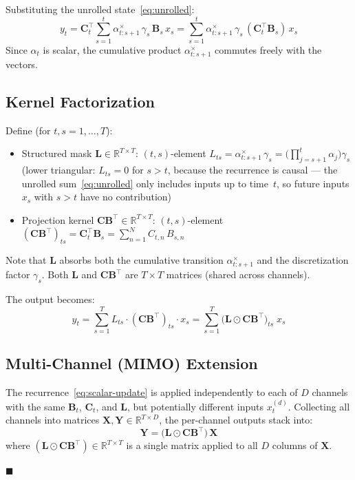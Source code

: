 \documentclass[11pt,a4paper]{article}
\begin{document}
Substituting the unrolled state~\eqref{eq:unrolled}:
\begin{equation}
  y_t = \mathbf{C}_t^\top \sum_{s=1}^{t}\alpha_{t:s+1}^\times\,\gamma_s\,\mathbf{B}_s\,x_s
  = \sum_{s=1}^{t}\alpha_{t:s+1}^\times\,\gamma_s\,(\mathbf{C}_t^\top\mathbf{B}_s)\,x_s
\end{equation}
Since $\alpha_t$ is scalar, the cumulative product $\alpha_{t:s+1}^\times$ commutes freely with the vectors.

\subsection{Kernel Factorization}

Define (for $t,s = 1,\dots,T$):
\begin{itemize}
  \item Structured mask $\mathbf{L}\in\mathbb{R}^{T\times T}$:\quad
    $(t,s)$-element $L_{ts}=\alpha_{t:s+1}^\times\,\gamma_s = \bigl(\prod_{j=s+1}^{t}\alpha_j\bigr)\gamma_s$
    \quad(lower triangular: $L_{ts}=0$ for $s>t$, because the recurrence is causal --- the unrolled sum~\eqref{eq:unrolled} only includes inputs up to time~$t$, so future inputs $x_s$ with $s>t$ have no contribution)
  \item Projection kernel $\mathbf{C}\mathbf{B}^\top\in\mathbb{R}^{T\times T}$:\quad
    $(t,s)$-element $(\mathbf{C}\mathbf{B}^\top)_{ts}=\mathbf{C}_t^\top\mathbf{B}_s = \sum_{n=1}^{N}C_{t,n}\,B_{s,n}$
\end{itemize}
Note that $\mathbf{L}$ absorbs both the cumulative transition $\alpha_{t:s+1}^\times$ and the discretization factor $\gamma_s$.
Both $\mathbf{L}$ and $\mathbf{C}\mathbf{B}^\top$ are $T\times T$ matrices (shared across channels).

The output becomes:
\begin{equation}
  y_t = \sum_{s=1}^{T}L_{ts}\cdot(\mathbf{C}\mathbf{B}^\top)_{ts}\cdot x_s
      = \sum_{s=1}^{T}\bigl(\mathbf{L}\odot\mathbf{C}\mathbf{B}^\top\bigr)_{ts}\;x_s
\end{equation}

\subsection{Multi-Channel (MIMO) Extension}

The recurrence~\eqref{eq:scalar-update} is applied independently to each of $D$ channels with the same $\mathbf{B}_t$, $\mathbf{C}_t$, and $\mathbf{L}$, but potentially different inputs $x_t^{(d)}$.
Collecting all channels into matrices $\mathbf{X},\mathbf{Y}\in\mathbb{R}^{T\times D}$, the per-channel outputs stack into:
\begin{equation}\label{eq:main}
  \boxed{\;\mathbf{Y} = \bigl(\mathbf{L}\odot\mathbf{C}\mathbf{B}^\top\bigr)\,\mathbf{X}\;}
\end{equation}
where $(\mathbf{L}\odot\mathbf{C}\mathbf{B}^\top)\in\mathbb{R}^{T\times T}$ is a single matrix applied to all $D$ columns of $\mathbf{X}$.

\hfill$\blacksquare$
\end{document}

